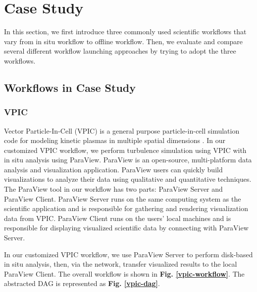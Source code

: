 \section{Case Study}
In this section, we first introduce three commonly used scientific workflows that vary from in situ workflow to offline workflow. Then, we evaluate and compare several different workflow launching approaches by trying to adopt the three workflows.

\subsection{Workflows in Case Study}
\subsubsection{VPIC}
Vector Particle-In-Cell (VPIC) is a general purpose particle-in-cell simulation code for modeling kinetic plasmas in multiple spatial dimensions \cite{bowers20080, bowers2008ultrahigh, bowers2009advances}. In our customized VPIC workflow, we perform turbulence simulation using VPIC with in situ analysis using ParaView. ParaView \cite{ahrens2005paraview, ayachit2015paraview} is an open-source, multi-platform data analysis and visualization application. ParaView users can quickly build visualizations to analyze their data using qualitative and quantitative techniques. The ParaView tool in our workflow has two parts: ParaView Server and ParaView Client. ParaView Server runs on the same computing system as the scientific application and is responsible for gathering and rendering visualization data from VPIC. ParaView Client runs on the users' local machines and is responsible for displaying visualized scientific data by connecting with ParaView Server.

In our customized VPIC workflow, we use ParaView Server to perform disk-based in situ analysis, then, via the network, transfer visualized results to the local ParaView Client. The overall workflow is shown in \textbf{Fig. \ref{vpic-workflow}}. The abstracted DAG is represented as \textbf{Fig. \ref{vpic-dag}}.


